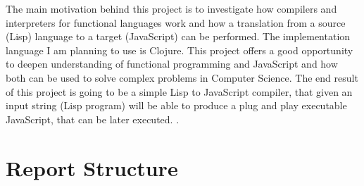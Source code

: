 \documentclass[11pt]{informatics-report}
\begin{document}
The main motivation behind this project is to investigate how compilers and interpreters for functional languages work and how a translation from a source (Lisp) language to a target (JavaScript) can be performed. The implementation language I am planning to use is Clojure. This project offers a good opportunity to deepen understanding of functional programming and JavaScript and how both can be used to solve complex problems in Computer Science. The end result of this project is going to be a simple Lisp to JavaScript compiler, that given an input string (Lisp program) will be able to produce a plug and play executable JavaScript, that can be later executed.
 \cite{refLabel}.

\section{Report Structure}












\appendix



\end{document}
